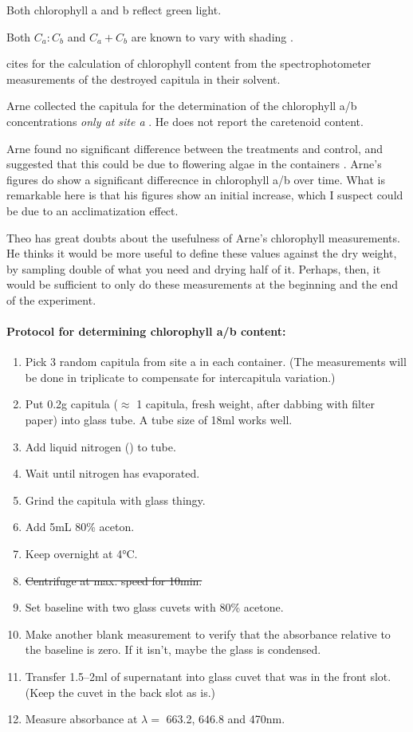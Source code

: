 \documentclass[12pt,a4paper,draft]{article}\usepackage[]{graphicx}\usepackage[]{color}
\begin{document}
Both chlorophyll a and b reflect green light.

Both $C_a:C_b$ and $C_a+C_b$ are known to vary with shading \citep{dale1992}.

\citet{lanting2010} cites \citet{lichtenthaler1987} for the calculation of chlorophyll content from the spectrophotometer measurements of the destroyed capitula in their solvent.

Arne collected the capitula for the determination of the chlorophyll a/b  concentrations \emph{only at site a} \citep[fig.~16,17]{lanting2010}. He does not report the caretenoid content.

Arne found no significant difference between the treatments and control, and suggested that this could be due to flowering algae in the containers \citep{lanting2010}.  Arne's figures do show a significant differecnce in chlorophyll a/b over time. What is remarkable here is that his figures show an initial increase, which I suspect could be due to an acclimatization effect.

Theo has great doubts about the usefulness of Arne's chlorophyll measurements. He thinks it would be more useful to define these values against the dry weight, by sampling double of what you need and drying half of it. Perhaps, then, it would be sufficient to only do these measurements at the beginning and the end of the experiment.

\paragraph{Protocol for determining chlorophyll a/b content:}

\begin{enumerate}
\item Pick 3 random capitula from site a in each container. (The measurements will be done in triplicate to compensate for intercapitula variation.)
\item Put 0.2g capitula ($\approx$ 1 capitula, fresh weight, after dabbing with filter paper) into glass tube. A tube size of 18ml works well.
\item Add liquid nitrogen () to tube.
\item Wait until nitrogen has evaporated.
\item Grind the capitula with glass thingy.
\item Add 5mL 80\% aceton.
\item Keep overnight at 4°C.
\item \sout{Centrifuge at max. speed for 10min.}
\item Set baseline with two glass cuvets with 80\% acetone.
\item Make another blank measurement to verify that the absorbance relative to the baseline is zero. If it isn't, maybe the glass is condensed.
\item Transfer 1.5--2ml of supernatant into glass cuvet that was in the front slot. (Keep the cuvet in the back slot as is.)
\item Measure absorbance at $\lambda=$ 663.2, 646.8 and 470nm.
\end{enumerate}
\end{document}
